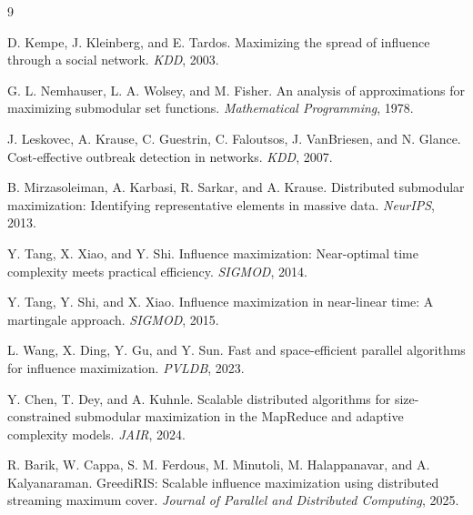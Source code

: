 \documentclass[UTF8, 11pt]{ctexart}
\begin{document}
\begin{thebibliography}{9}

D. Kempe, J. Kleinberg, and E. Tardos.
\newblock Maximizing the spread of influence through a social network.
\newblock \emph{KDD}, 2003.

G. L. Nemhauser, L. A. Wolsey, and M. Fisher.
\newblock An analysis of approximations for maximizing submodular set functions.
\newblock \emph{Mathematical Programming}, 1978.

J. Leskovec, A. Krause, C. Guestrin, C. Faloutsos, J. VanBriesen, and N. Glance.
\newblock Cost-effective outbreak detection in networks.
\newblock \emph{KDD}, 2007.

B. Mirzasoleiman, A. Karbasi, R. Sarkar, and A. Krause.
\newblock Distributed submodular maximization: Identifying representative elements in massive data.
\newblock \emph{NeurIPS}, 2013.

Y. Tang, X. Xiao, and Y. Shi.
\newblock Influence maximization: Near-optimal time complexity meets practical efficiency.
\newblock \emph{SIGMOD}, 2014.

Y. Tang, Y. Shi, and X. Xiao.
\newblock Influence maximization in near-linear time: A martingale approach.
\newblock \emph{SIGMOD}, 2015.

L. Wang, X. Ding, Y. Gu, and Y. Sun.
\newblock Fast and space-efficient parallel algorithms for influence maximization.
\newblock \emph{PVLDB}, 2023.

Y. Chen, T. Dey, and A. Kuhnle.
\newblock Scalable distributed algorithms for size-constrained submodular maximization in the MapReduce and adaptive complexity models.
\newblock \emph{JAIR}, 2024.

R. Barik, W. Cappa, S. M. Ferdous, M. Minutoli, M. Halappanavar, and A. Kalyanaraman.
\newblock GreediRIS: Scalable influence maximization using distributed streaming maximum cover.
\newblock \emph{Journal of Parallel and Distributed Computing}, 2025.

\end{thebibliography}
\end{document}
